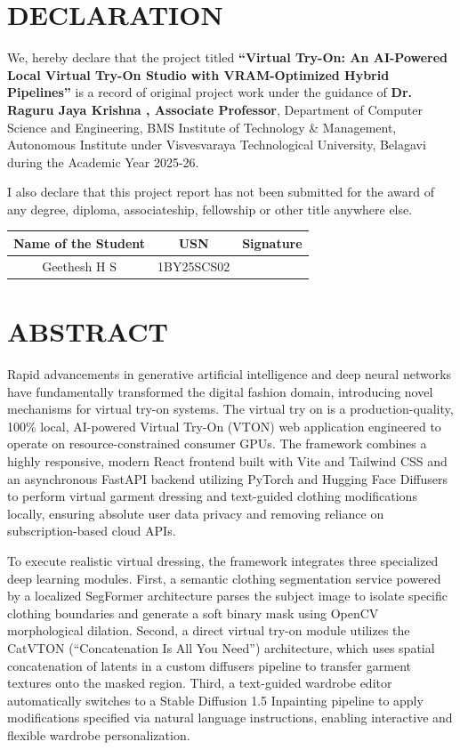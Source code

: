 \documentclass[12pt, a4paper]{report}
\newcommand{\projectTitle}{Virtual Try-On: An AI-Powered Local Virtual Try-On Studio with VRAM-Optimized Hybrid Pipelines}
\newcommand{\guideName}{Dr. Raguru Jaya Krishna }
\newcommand{\guideDesignation}{Associate Professor}
\newcommand{\academicYear}{2025-26}
\begin{document}
\chapter*{DECLARATION}

We, hereby declare that the project titled \textbf{``\projectTitle''} is a record of original project work under the guidance of \textbf{\guideName, \guideDesignation}, Department of Computer Science and Engineering, BMS Institute of Technology \& Management, Autonomous Institute under Visvesvaraya Technological University, Belagavi during the Academic Year \academicYear.

I also declare that this project report has not been submitted for the award of any degree, diploma, associateship, fellowship or other title anywhere else.

\vspace{1cm}
\begin{table}[h]
\centering
\begin{tabular}{|c|c|c|}
\hline
\textbf{Name of the Student} & \textbf{USN} & \textbf{   Signature   } \\ \hline
\rule{0pt}{3ex} Geethesh H S & 1BY25SCS02 &  \\ \hline
\end{tabular}
\end{table}

\chapter*{ABSTRACT}
Rapid advancements in generative artificial intelligence and deep neural networks have fundamentally transformed the digital fashion domain, introducing novel mechanisms for virtual try-on systems. The virtual try on is a production-quality, 100\% local, AI-powered Virtual Try-On (VTON) web application engineered to operate on resource-constrained consumer GPUs. The framework combines a highly responsive, modern React frontend built with Vite and Tailwind CSS and an asynchronous FastAPI backend utilizing PyTorch and Hugging Face Diffusers to perform virtual garment dressing and text-guided clothing modifications locally, ensuring absolute user data privacy and removing reliance on subscription-based cloud APIs.

To execute realistic virtual dressing, the framework integrates three specialized deep learning modules. First, a semantic clothing segmentation service powered by a localized SegFormer architecture parses the subject image to isolate specific clothing boundaries and generate a soft binary mask using OpenCV morphological dilation. Second, a direct virtual try-on module utilizes the CatVTON (``Concatenation Is All You Need'') architecture, which uses spatial concatenation of latents in a custom diffusers pipeline to transfer garment textures onto the masked region. Third, a text-guided wardrobe editor automatically switches to a Stable Diffusion 1.5 Inpainting pipeline to apply modifications specified via natural language instructions, enabling interactive and flexible wardrobe personalization.
\end{document}
